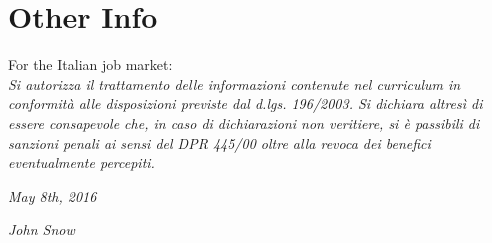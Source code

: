 \documentclass[]{friggeri-cv}
\begin{document}
\section{Other Info}
For the Italian job market:\\
\emph{Si autorizza il trattamento delle informazioni contenute nel curriculum in conformità alle disposizioni previste dal d.lgs. 196/2003. Si dichiara altresì di essere consapevole che, in caso di dichiarazioni non veritiere, si è passibili di sanzioni penali ai sensi del DPR 445/00 oltre alla revoca dei benefici eventualmente percepiti.}
\\
\begin{flushleft}
\emph{May 8th, 2016}
\end{flushleft}
\begin{flushright}
\emph{John Snow}
\end{flushright}
\end{document}

